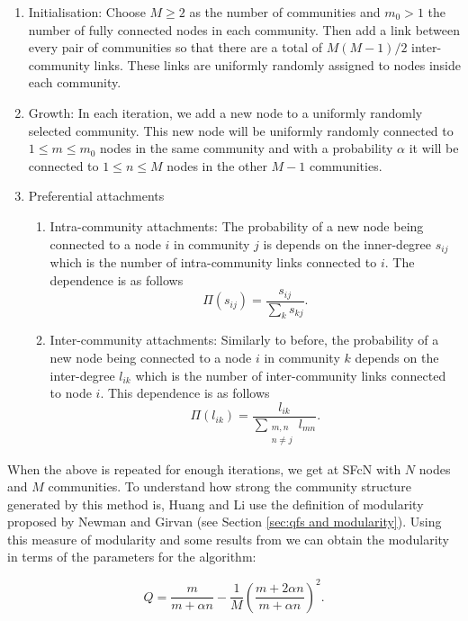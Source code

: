 \begin{enumerate}
    \item Initialisation: Choose $M \geq 2$ as the number of communities and $m_0 > 1$ the number of fully connected nodes in each community. Then add a link between every pair of communities so that there are a total of $M(M-1)/2$ inter-community links. These links are uniformly randomly assigned to nodes inside each community. \\
    \item Growth: In each iteration, we add a new node to a uniformly randomly selected community. This new node will be uniformly randomly connected to $1 \leq m \leq m_0$ nodes in the same community and with a probability $\alpha$ it will be connected to $1 \leq n \leq M$ nodes in the other $M - 1$ communities. \\
    \item Preferential attachments
    \begin{enumerate}
        \item Intra-community attachments: The probability of a new node being connected to a node $i$ in community $j$ is depends on the inner-degree $s_{ij}$ which is the number of intra-community links connected to $i$. The dependence is as follows
            $$ \Pi(s_{ij}) = \frac{s_{ij}}{\sum_ks_{kj}}. $$
        \item Inter-community attachments: Similarly to before, the probability of a new node being connected to a node $i$ in community $k$ depends on the inter-degree $l_{ik}$ which is the number of inter-community links connected to node $i$. This dependence is as follows
            $$ \Pi(l_{ik}) = \frac{l_{ik}}{\sum_{\substack{m, n \\ n \not = j}} l_{mn}}. $$
    \end{enumerate}
\end{enumerate}

When the above is repeated for enough iterations, we get at SFcN with $N$ nodes and $M$ communities. To understand how strong the community structure generated by this method is, Huang and Li use the definition of modularity proposed by Newman and Girvan (see Section \ref{sec:qfs and modularity}). Using this measure of modularity and some results from \cite{Li_2005} we can obtain the modularity in terms of the parameters for the algorithm:

$$ Q = \frac{m}{m + \alpha n} - \frac{1}{M}\left(\frac{m + 2\alpha n}{m + \alpha n}\right)^2. $$

